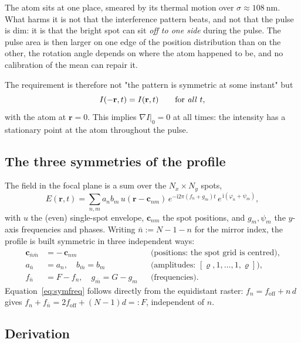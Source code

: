 \documentclass[11pt,a4paper]{article}
\begin{document}
The atom sits at one place, smeared by its thermal motion over
$\sigma\approx\SI{108}{\nano\meter}$. What harms it is not that the
interference pattern beats, and not that the pulse is dim: it is that the
bright spot can sit \emph{off to one side} during the pulse. The pulse area
is then larger on one edge of the position distribution than on the other,
the rotation angle depends on where the atom happened to be, and no
calibration of the mean can repair it.

The requirement is therefore not "the pattern is symmetric at some instant"
but
\begin{equation}
  I(-\mathbf{r},t) = I(\mathbf{r},t) \qquad\text{for \emph{all} } t ,
  \label{eq:centred}
\end{equation}
with the atom at $\mathbf r = 0$. This implies $\nabla I|_{0} = 0$ at all
times: the intensity has a stationary point at the atom throughout the pulse.

\subsection{The three symmetries of the profile}

The field in the focal plane is a sum over the $N_x\times N_y$ spots,
\begin{equation}
  E(\mathbf r,t) = \sum_{n,m} a_n b_m\,
    u(\mathbf r - \mathbf c_{nm})\,
    e^{-\mathrm{i}2\pi (f_n+g_m)t}\,
    e^{\,\mathrm{i}(\varphi_n+\psi_m)} ,
  \label{eq:field}
\end{equation}
with $u$ the (even) single-spot envelope, $\mathbf c_{nm}$ the spot
positions, and $g_m,\psi_m$ the $y$-axis frequencies and phases. Writing
$\bar n := N-1-n$ for the mirror index, the profile is built symmetric in
three independent ways:
\begin{align}
  \mathbf c_{\bar n\bar m} &= -\,\mathbf c_{nm}
    &&\text{(positions: the spot grid is centred),}\label{eq:symgeo}\\
  a_{\bar n} &= a_n , \quad b_{\bar m} = b_m
    &&\text{(amplitudes: } [\varrho,1,\dots,1,\varrho]\text{),}\label{eq:symamp}\\
  f_{\bar n} &= F - f_n , \quad g_{\bar m} = G - g_m
    &&\text{(frequencies).}\label{eq:symfreq}
\end{align}
Equation~\eqref{eq:symfreq} follows directly from the equidistant raster:
$f_n = f_\mathrm{off}+n\,d$ gives
$f_n + f_{\bar n} = 2f_\mathrm{off} + (N-1)d =: F$, independent of $n$.

\subsection{Derivation}
\end{document}
